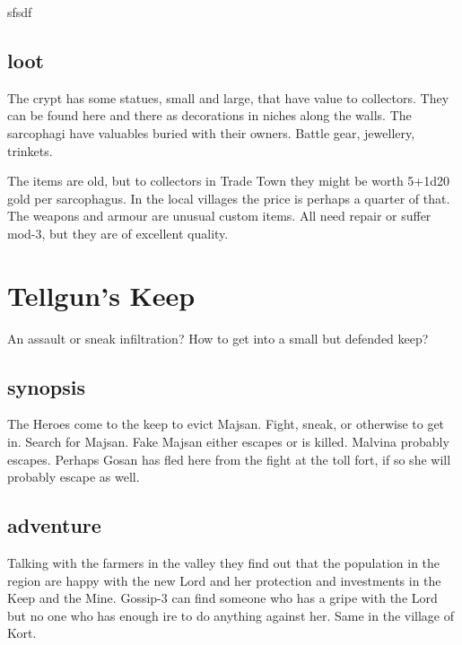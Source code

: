 sfsdf


\subsection*{loot}
The crypt has some statues, small and large, that have value to collectors. They can be found here and there as decorations in niches along the walls. The sarcophagi have valuables buried with their owners. Battle gear, jewellery, trinkets.

The items are old, but to collectors in Trade Town they might be worth 5+1d20 gold per sarcophagus. In the local villages the price is perhaps a quarter of that. The weapons and armour are unusual custom items. All need repair or suffer mod-3, but they are of excellent quality.










\section*{Tellgun's Keep}
An assault or sneak infiltration? How to get into a small but defended keep?


\subsection*{synopsis}
The Heroes come to the keep to evict Majsan. Fight, sneak, or otherwise to get in. Search for Majsan. Fake Majsan either escapes or is killed. Malvina probably escapes. Perhaps Gosan has fled here from the fight at the toll fort, if so she will probably escape as well.


\subsection*{adventure}
Talking with the farmers in the valley they find out that the population in the region are happy with the new Lord and her protection and investments in the Keep and the Mine. Gossip-3 can find someone who has a gripe with the Lord but no one who has enough ire to do anything against her. Same in the village of Kort.

